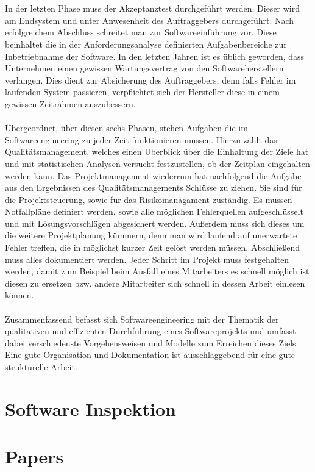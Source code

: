 \documentclass{llncs}
\begin{document}
\\ \\
In der letzten Phase muss der Akzeptanztest durchgeführt werden. Dieser wird am Endsystem und unter Anwesenheit des Auftraggebers durchgeführt. Nach erfolgreichem Abschluss schreitet man zur Softwareeinführung vor. Diese beinhaltet die in der Anforderungsanalyse definierten Aufgabenbereiche zur Inbetriebnahme der Software. In den letzten Jahren ist es üblich geworden, dass Unternehmen einen gewissen Wartungsvertrag von den Softwareherstellern verlangen. Dies dient zur Absicherung des Auftraggebers, denn falls Fehler im laufenden System passieren, verpflichtet sich der Hersteller diese in einem gewissen Zeitrahmen auszubessern. 
\\ \\
Übergeordnet, über diesen sechs Phasen, stehen Aufgaben die im Softwareengineering zu jeder Zeit funktionieren müssen. Hierzu zählt das Qualitätsmanagement, welches einen Überblick über die Einhaltung der Ziele hat und mit statistischen Analysen versucht festzustellen, ob der Zeitplan eingehalten werden kann. Das Projektmanagement wiederrum hat nachfolgend die Aufgabe aus den Ergebnissen des Qualitätsmanagements Schlüsse zu ziehen. Sie sind für die Projektsteuerung, sowie für das Risikomanagament zuständig. Es müssen Notfallpläne definiert werden, sowie alle möglichen Fehlerquellen aufgeschlüsselt und mit Lösungsvorschlägen abgesichert werden. Außerdem muss sich dieses um die weitere Projektplanung kümmern, denn man wird laufend auf unerwartete Fehler treffen, die in möglichst kurzer Zeit gelöst werden müssen. Abschließend muss alles dokumentiert werden. Jeder Schritt im Projekt muss festgehalten werden, damit zum Beispiel beim Ausfall eines Mitarbeiters es schnell möglich ist diesen zu ersetzen bzw. andere Mitarbeiter sich schnell in dessen Arbeit einlesen können.
\\ \\
Zusammenfassend befasst sich Softwareengineering mit der Thematik der qualitativen und effizienten Durchführung eines Softwareprojekts und umfasst dabei verschiedenste Vorgehensweisen und Modelle zum Erreichen dieses Ziels. Eine gute Organisation und Dokumentation ist ausschlaggebend für eine gute strukturelle Arbeit.


\section{Software Inspektion}

\section{Papers}
\end{document}

